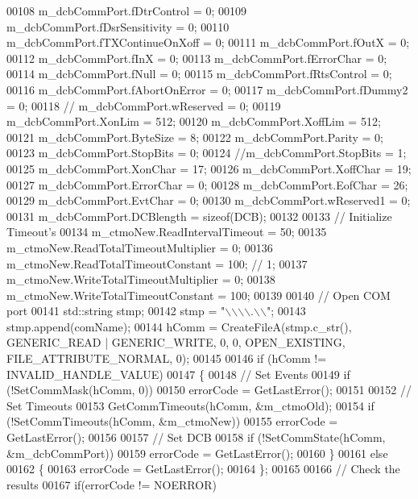 \begin{DoxyCode}
00108     m_dcbCommPort.fDtrControl = 0;
00109     m_dcbCommPort.fDsrSensitivity = 0;
00110     m_dcbCommPort.fTXContinueOnXoff = 0;
00111     m_dcbCommPort.fOutX = 0;
00112     m_dcbCommPort.fInX = 0;
00113     m_dcbCommPort.fErrorChar = 0;
00114     m_dcbCommPort.fNull = 0;
00115     m_dcbCommPort.fRtsControl = 0;
00116     m_dcbCommPort.fAbortOnError = 0;
00117     m_dcbCommPort.fDummy2 = 0;
00118     \textcolor{comment}{// m\_dcbCommPort.wReserved = 0;}
00119     m_dcbCommPort.XonLim = 512;
00120     m_dcbCommPort.XoffLim = 512;
00121     m_dcbCommPort.ByteSize = 8;
00122     m_dcbCommPort.Parity = 0;
00123     m_dcbCommPort.StopBits = 0;
00124     \textcolor{comment}{//m\_dcbCommPort.StopBits = 1;}
00125     m_dcbCommPort.XonChar = 17;
00126     m_dcbCommPort.XoffChar = 19;
00127     m_dcbCommPort.ErrorChar = 0;
00128     m_dcbCommPort.EofChar = 26;
00129     m_dcbCommPort.EvtChar = 0;
00130     m_dcbCommPort.wReserved1 = 0;
00131     m_dcbCommPort.DCBlength = \textcolor{keyword}{sizeof}(DCB);
00132 
00133     \textcolor{comment}{// Initialize Timeout's}
00134     m_ctmoNew.ReadIntervalTimeout = 50;
00135     m_ctmoNew.ReadTotalTimeoutMultiplier = 0;
00136     m_ctmoNew.ReadTotalTimeoutConstant = 100; \textcolor{comment}{// 1;}
00137     m_ctmoNew.WriteTotalTimeoutMultiplier = 0;
00138     m_ctmoNew.WriteTotalTimeoutConstant = 100;
00139 
00140     \textcolor{comment}{// Open COM port}
00141     std::string stmp;
00142     stmp = \textcolor{stringliteral}{"\(\backslash\)\(\backslash\)\(\backslash\)\(\backslash\).\(\backslash\)\(\backslash\)"};
00143     stmp.append(comName);
00144     hComm = CreateFileA(stmp.c\_str(), GENERIC\_READ | GENERIC\_WRITE, 0, 0, OPEN\_EXISTING, 
      FILE\_ATTRIBUTE\_NORMAL, 0);
00145 
00146     \textcolor{keywordflow}{if} (hComm != INVALID\_HANDLE\_VALUE)
00147     \{
00148         \textcolor{comment}{// Set Events}
00149         \textcolor{keywordflow}{if} (!SetCommMask(hComm, 0))
00150             errorCode = GetLastError();
00151 
00152         \textcolor{comment}{// Set Timeouts}
00153         GetCommTimeouts(hComm, &m_ctmoOld);
00154         \textcolor{keywordflow}{if} (!SetCommTimeouts(hComm, &m_ctmoNew))
00155             errorCode = GetLastError();
00156 
00157         \textcolor{comment}{// Set DCB}
00158         \textcolor{keywordflow}{if} (!SetCommState(hComm, &m_dcbCommPort))
00159             errorCode = GetLastError();
00160     \}
00161     \textcolor{keywordflow}{else}
00162     \{
00163         errorCode = GetLastError();
00164     \};
00165 
00166     \textcolor{comment}{// Check the results}
00167     \textcolor{keywordflow}{if}(errorCode != NOERROR)

\end{DoxyCode}
